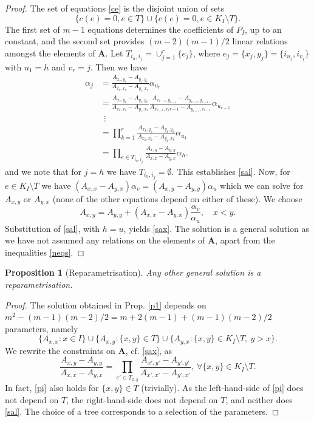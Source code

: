 \documentclass{article}
\newcounter{NN}
\newtheorem{proposition}[NN]{Proposition}
\def\A{\mathbf{A}}
\begin{document}
\begin{proof}
The set of equations \eqref{ce} is the disjoint union of sets
\[
\{c(e)=0, e\in T\} \cup \{c(e)=0, e\in K_I\setminus T\}.
\]
The first set of $m-1$ equations determines the coefficients of $P_I$, up to an constant, and the second set provides $(m-2)(m-1)/2$ linear relations amongst the elements of $\A$.
Let $T_{i_h,i_j}=\cup_{j=1}^r \{e_j\}$, where $e_j=\{x_j,y_j\}=\{i_{u_j},i_{v_j}\}$ with $u_1=h$ and $v_r=j$. Then we have
\begin{align*}
\alpha_j&=\frac{A_{x_r,y_r}-A_{y_r,y_r}}{A_{x_r,x_r}-A_{y_r,x_r}}\alpha_{u_r}\\
&=\frac{A_{x_r,y_r}-A_{y_r,y_r}}{A_{x_r,x_r}-A_{y_r,x_r}}
\frac{A_{x_{r-1},y_{r-1}}-A_{y_{r-1},y_{r-1}}}{A_{x_{r-1},x_r{r-1}}-A_{y_{r-1},x_{r-1}}}\alpha_{u_{r-1}}\\
&\ \ \vdots\\
&=\prod_{k=1}^r \frac{A_{x_k,y_k}-A_{y_k,y_k}}{A_{x_k,x_k}-A_{y_k,x_k}}\alpha_{u_1}\\
&=\prod_{e\in T_{i_h,i_j}} \frac{A_{x,y}-A_{y,y}}{A_{x,x}-A_{y,x}} \alpha_{h}.
\end{align*}
and we note that for $j=h$ we have $T_{i_h,i_j}=\emptyset$. This establishes \eqref{sal}.
Now, for $e\in K_I\setminus T$ we have $(A_{x,x}-A_{y,x})\alpha_{v}=(A_{x,y}-A_{y,y})\alpha_{u}$ which we can solve for $A_{x,y}$ or $A_{y,x}$ (none of the other equations depend on either of these). We choose
\[
A_{x,y}=A_{y,y}+(A_{x,x}-A_{y,x})\frac{\alpha_{v}}{\alpha_{u}},\quad x<y.
\]
Substitution of \eqref{sal}, with $h=u$, yields \eqref{sax}. The solution is a general solution as we have not assumed any relations on the elements of $\A$, apart from the inequalities \eqref{neqs}.
\end{proof}

\begin{proposition}[Reparametrisation]\label{p2}
Any other general solution is a reparametrisation.
\end{proposition}
\begin{proof}
The solution obtained in Prop. \ref{p1} depends on $m^2-(m-1)(m-2)/2=m+2(m-1)+(m-1)(m-2)/2$ parameters, namely
\[
\{A_{x,x}: x\in I\} \cup \{A_{x,y}: \{x,y\}\in T\} \cup \{A_{y,x}: \{x,y\}\in K_I\setminus T,\ y>x\}.
\]
We rewrite the constraints on $\A$, cf. \eqref{sax}, as
\begin{equation} \label{pi}
\frac{A_{x,y}-A_{y,y}}{A_{x,x}-A_{y,x}}=\prod_{e'\in T_{x,y}}\frac{A_{x',y'}-A_{y',y'}}{A_{x',x'}-A_{y',x'}},\ \forall \{x,y\}\in K_I\setminus T.
\end{equation}
In fact, \eqref{pi} also holds for $\{x,y\}\in T$ (trivially). As the left-hand-side of \eqref{pi} does not depend on $T$, the right-hand-side does not depend on $T$, and neither does \eqref{sal}. The choice of a tree corresponds to a selection of the parameters.
\end{proof}
\end{document}
